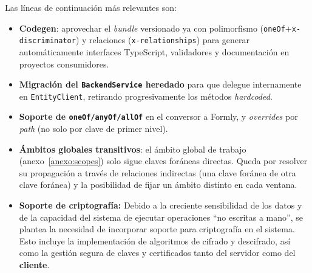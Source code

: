 Las líneas de continuación más relevantes son:

\begin{itemize}
  \item[\textbullet] \textbf{Codegen}: aprovechar el \emph{bundle} versionado ya con
  polimorfismo \newline (\texttt{oneOf}\allowbreak+\allowbreak\texttt{x-discriminator}) y relaciones
  (\texttt{x-relationships}) para generar automáticamente interfaces
  TypeScript, validadores y documentación en proyectos consumidores.
  \item[\textbullet] \textbf{Migración del \texttt{BackendService} heredado} para que
  delegue internamente en \newline \texttt{EntityClient}, retirando progresivamente los
  métodos \emph{hardcoded}.
  \item[\textbullet] \textbf{Soporte de \texttt{oneOf/anyOf/allOf}} en el conversor a
  Formly, y \emph{overrides} por \emph{path} (no solo por clave de primer
  nivel).
  \item[\textbullet] \textbf{Ámbitos globales transitivos}: el ámbito global de
  trabajo (anexo~\ref{anexo:scopes}) solo sigue claves foráneas directas. Queda
  por resolver su propagación a través de relaciones indirectas (una clave
  foránea de otra clave foránea) y la posibilidad de fijar un ámbito distinto
  en cada ventana.
  \item[\textbullet] \textbf{Soporte de criptografía:} Debido a la creciente sensibilidad de los datos
  y de la capacidad del sistema de ejecutar operaciones ``no escritas a mano'', se plantea
   la necesidad de incorporar soporte para criptografía en el sistema. 
   Esto incluye la implementación de algoritmos de cifrado y descifrado, 
   así como la gestión segura de claves y certificados tanto del servidor como del \textbf{cliente}.
\end{itemize}
